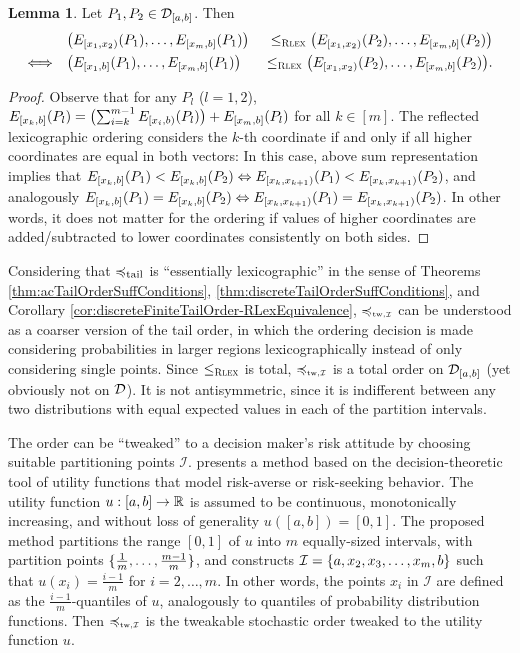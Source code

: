\documentclass[a4paper,DIV=11,abstracton,twoside=semi]{scrreprt}
\theoremstyle{definition}
\newtheorem{lemma}[thm]{Lemma} %
\begin{document}
    \begin{lemma}
        Let $P_1, P_2 \in \mathcal{D}_{[a, b]}$.
        Then
        \begin{alignat*}{3}
                                     &\bigl(E_{[x_1, x_2)}(P_{1}), \dots, E_{[x_m, b]}(P_1)\bigr)\; &\leq_{\textsc{Rlex}} \bigl(E_{[x_1, x_2)}(P_2), \dots, E_{[x_m, b]}(P_2)\bigr) \\
            \Longleftrightarrow\quad &\bigl(E_{[x_1, b]}(P_{1}), \dots, E_{[x_m, b]}(P_1)\bigr) &\leq_{\textsc{Rlex}} \bigl(E_{[x_1, x_2)}(P_2), \dots, E_{[x_m, b]}(P_2)\bigr).
        \end{alignat*}
    \end{lemma}
    \begin{proof}
        Observe that for any $P_l$ ($l = 1, 2$), $E_{[x_k, b]}(P_l) = \bigl(\sum_{i=k}^{m-1} E_{[x_i, b)}(P_l)\bigr) + E_{[x_m, b]}(P_l)$ for all $k \in [m]$.
        The reflected lexicographic ordering considers the $k$-th coordinate if and only if all higher coordinates are equal in both vectors:
        In this case, above sum representation implies that $E_{[x_k, b]}(P_1) < E_{[x_k, b]}(P_2) \Leftrightarrow E_{[x_k, x_{k+1})}(P_1) < E_{[x_k, x_{k+1})}(P_2)$, and analogously $E_{[x_k, b]}(P_1) = E_{[x_k, b]}(P_2) \Leftrightarrow E_{[x_k, x_{k+1})}(P_1) = E_{[x_k, x_{k+1})}(P_2)$.
        In other words, it does not matter for the ordering if values of higher coordinates are added/subtracted to lower coordinates consistently on both sides.
    \end{proof}

    Considering that $\preccurlyeq_{\text{tail}}$ is “essentially lexicographic” in the sense of Theorems \ref{thm:acTailOrderSuffConditions}, \ref{thm:discreteTailOrderSuffConditions}, and Corollary \ref{cor:discreteFiniteTailOrder-RLexEquivalence},
    $\leqtw$ can be understood as a coarser version of the tail order, in which the ordering decision is made considering probabilities in larger regions lexicographically instead of only considering single points.
    Since $\leq_{\textsc{Rlex}}$ is total, $\leqtw$ is a total order on $\mathcal{D}_{[a, b]}$ (yet obviously not on $\mathcal{D}$). It is not antisymmetric, since it is indifferent between any two distributions with equal expected values in each of the partition intervals.
    
    The order can be “tweaked” to a decision maker's risk attitude by choosing suitable partitioning points $\mathcal{I}$. \cite{bib:tweakableStochasticOrders} presents a method based on the decision-theoretic tool of utility functions that model risk-averse or risk-seeking behavior.    
    The utility function $u: [a, b] \to \mathbb{R}$ is assumed to be continuous, monotonically increasing, and without loss of generality $u([a, b]) = [0, 1]$.
    The proposed method partitions the range $[0, 1]$ of $u$ into $m$ equally-sized intervals, with partition points $\{\frac{1}{m}, \dots, \frac{m-1}{m}\}$, and constructs $\mathcal{I} = \{a, x_2, x_3, \dots, x_m, b\}$ such that $u(x_i) = \frac{i-1}{m}$ for $i = 2, \dots, m$.
    In other words, the points $x_i$ in $\mathcal{I}$ are defined as the $\frac{i-1}{m}$-quantiles of $u$, analogously to quantiles of probability distribution functions. Then $\leqtw$ is the tweakable stochastic order tweaked to the utility function $u$.
    
\end{document}
